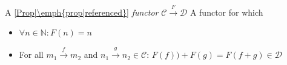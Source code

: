 
A \ref{Prop|\emph{prop|referenced}} \emph{functor} $\mathcal{C} \xrightarrow F \mathcal{D}$
A functor for which
\begin{itemize}
  \item $\forall n \in \mathbb{N}: F(n)=n$
  \item For all $m_1 \xrightarrow f m_2$ and $n_1 \xrightarrow g n_2 \in \mathcal{C}$: $F(f))+F(g)=F(f+g) \in \mathcal{D}$
\end{itemize}

